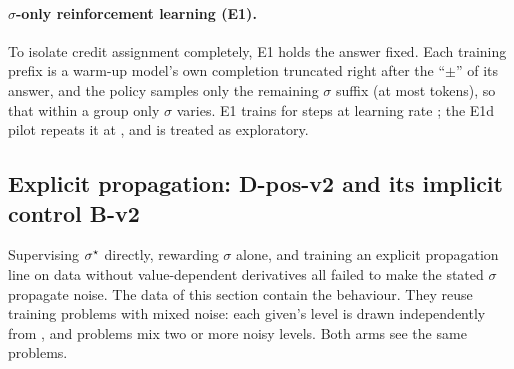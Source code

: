 \paragraph{$\sigma$-only reinforcement learning (E1).}
To isolate credit assignment completely, E1 holds the answer fixed.
Each training prefix is a warm-up model's own completion truncated right after the ``$\pm$'' of its answer, and the
policy samples only the remaining $\sigma$ suffix (at most  tokens), so that within a group only
$\sigma$ varies.
E1 trains for  steps at learning rate ; the E1d pilot repeats it at , and is
treated as exploratory.

\subsection{Explicit propagation: D-pos-v2 and its implicit control B-v2}
\label{sec:dpos}

Supervising $\sigma^{\star}$ directly, rewarding $\sigma$ alone, and training an explicit propagation line on data without
value-dependent derivatives all failed to make the stated $\sigma$ propagate noise.
The data of this section contain the behaviour.
They reuse  training problems with mixed noise: each given's level is drawn independently from
, and  problems mix two or more noisy levels.
Both arms see the same problems.

